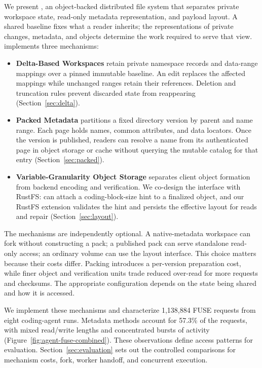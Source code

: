 We present \sys, an object-backed distributed file system that separates
private workspace state, read-only metadata representation, and payload
layout. A shared baseline fixes what a reader inherits; the representations
of private changes, metadata, and objects determine the work required
to serve that view. \sys implements three mechanisms:

\begin{itemize}
\item \textbf{Delta-Based Workspaces} retain private namespace records
and data-range mappings over a pinned immutable baseline. An edit
replaces the affected mappings while unchanged ranges retain their
references. Deletion and truncation rules prevent discarded state from
reappearing (Section~\ref{sec:delta}).
\item \textbf{Packed Metadata} partitions a fixed directory version
by parent and name range. Each page holds names, common attributes,
and data locators. Once the version is published, readers can resolve
a name from its authenticated page in object storage or cache without
querying the mutable catalog for that entry (Section~\ref{sec:packed}).
\item \textbf{Variable-Granularity Object Storage} separates client
object formation from backend encoding and verification. We co-design
the interface with RustFS: \sys can attach a coding-block-size hint to
a finalized object, and our RustFS extension validates the hint and
persists the effective layout for reads and repair
(Section~\ref{sec:layout}).
\end{itemize}

The mechanisms are independently optional. A native-metadata workspace
can fork without constructing a pack; a published pack can serve
standalone read-only access; an ordinary volume can use the layout
interface. This choice matters because their costs differ. Packing
introduces a per-version preparation cost, while finer object and
verification units trade reduced over-read for more requests and
checksums. The appropriate configuration depends on the state being
shared and how it is accessed.

We implement these mechanisms and characterize 1,138,884 FUSE requests
from eight coding-agent runs. Metadata methods account for 57.3\% of
the requests, with mixed read/write lengths and concentrated bursts
of activity (Figure~\ref{fig:agent-fuse-combined}). These observations
define access patterns for evaluation. Section~\ref{sec:evaluation}
sets out the controlled comparisons for mechanism costs, fork, worker
handoff, and concurrent execution.
